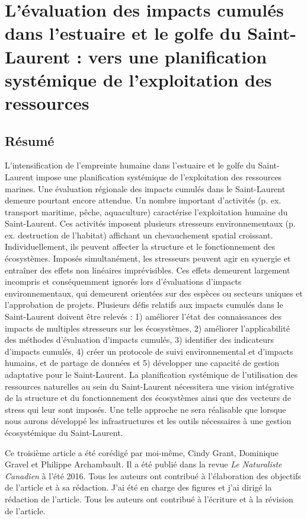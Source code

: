 \chapter{L'évaluation des impacts cumulés dans l'estuaire et le golfe du Saint-Laurent : vers une planification systémique de l'exploitation des ressources}
\label{chap3}

\section{Résumé}

L'intensification de l'empreinte humaine dans l'estuaire et le golfe du Saint-Laurent impose une planification systémique de l'exploitation des ressources marines. Une évaluation régionale des impacts cumulés dans le Saint-Laurent demeure pourtant encore attendue. Un nombre important d'activités (p. ex. transport maritime, pêche, aquaculture) caractérise l'exploitation humaine du Saint-Laurent. Ces activités imposent plusieurs stresseurs environnementaux (p. ex. destruction de l'habitat) affichant un chevauchement spatial croissant. Individuellement, ils peuvent affecter la structure et le fonctionnement des écosystèmes. Imposés simultanément, les stresseurs peuvent agir en synergie et entraîner des effets non linéaires imprévisibles. Ces effets demeurent largement incompris et conséquemment ignorés lors d'évaluations d'impacts environnementaux, qui demeurent orientées sur des espèces ou secteurs uniques et l'approbation de projets. Plusieurs défis relatifs aux impacts cumulés dans le Saint-Laurent doivent être relevés : 1) améliorer l'état des connaissances des impacts de multiples stresseurs sur les écosystèmes, 2) améliorer l'applicabilité des méthodes d'évaluation d'impacts cumulés, 3) identifier des indicateurs d'impacts cumulés, 4) créer un protocole de suivi environnemental et d'impacts humains, et de partage de données et 5) développer une capacité de gestion adaptative pour le Saint-Laurent. La planification systémique de l'utilisation des ressources naturelles au sein du Saint-Laurent nécessitera une vision intégrative de la structure et du fonctionnement des écosystèmes ainsi que des vecteurs de stress qui leur sont imposés. Une telle approche ne sera réalisable que lorsque nous aurons développé les infrastructures et les outils nécessaires à une gestion écosystémique du Saint-Laurent.

Ce troisième article a été corédigé par moi-même, Cindy Grant, Dominique Gravel et Philippe Archambault. Il a été publié dans la revue \textit{Le Naturaliste Canadien} à l'été 2016. Tous les auteurs ont contribué à l'élaboration des objectifs de l'article et à sa rédaction. J'ai été en charge des figures et j'ai dirigé la rédaction de l'article. Tous les auteurs ont contribué à l'écriture et à la révision de l'article. \linebreak[4]

